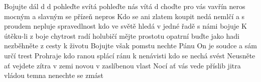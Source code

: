 \begin{TEXT}{Bojujte dál}
\REFREN   {}  d \NL
{}  d \NL
{}pohleďte   svítá \NL
{}pohleďte   nás vítá \NL
{}  d 
\SLOKA {} choďte    \NL
{} pro vás vavřín neros \NL
{} mocným  a slavným   \NL
{} se přízeň nepros 
\SLOKA Kdo se ani zlatem koupit nedá \NL
nemlčí a s proudem nepluje \NL
spravedlnost kdo ve světě hledá \NL
v jedné řadě s námi bojuje 
\SLOKA K útěku-li z boje chytrost radí \NL
holubičí mějte prostotu \NL
opatrní buďte jako hadi \NL
nezběhněte z cesty k životu 
\SLOKA Bojujte však pomstu nechte Pánu \NL
On je soudce a sám určí trest \NL
Prohraje kdo ranou splácí ránu \NL
k nenávisti kdo se nechá svést \pagebreak
\SLOKA Neusněte ať vejdete zítra \NL
v zemi novou v zaslíbenou vlast \NL
Nocí ať vás vede příslib jitra \NL
vládou temna nenechte se zmást 
\end{TEXT}
